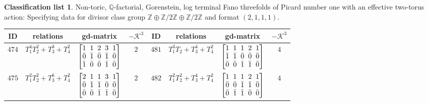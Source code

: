 \documentclass[10pt,a4paper]{amsart}
\theoremstyle{definition}
\newtheorem{class-list}[thm]{Classification list}
\def\ZZ{{\mathbb Z}}
\def\QQ{{\mathbb Q}}
\numberwithin{equation}{section}
\begin{document}
\begin{class-list}
Non-toric, $\QQ$-factorial, Gorenstein, log terminal Fano
threefolds of Picard number one with an effective two-torus action:
Specifying data for divisor class group
$\ZZ\oplus \ZZ/2\ZZ\oplus \ZZ/2\ZZ$ and format $(2,1,1,1)$.
\begin{table}[h!]\centering\setlength{\tabcolsep}{3.5pt}
\renewcommand{\arraystretch}{1.15}\small\tabulinesep=1mm
\begin{tabu}{c|c|c|c||c|c|c|c}
\hline
ID&relations&gd-matrix&$-\mathcal{K}^3$&ID&relations&gd-matrix&$-\mathcal{K}^3$
\\
\hline
${474}$&${T_{1}^{4}T_{2}^{2}+T_{3}^{3}+T_{4}^{2}}$
&$\arraycolsep=1mm\begin{bmatrix}{1} & {1} & {2} & {3} & {1} \\ {\bar{0}} & {\bar{1}} & {\bar{0}} & {\bar{1}} & {\bar{0}} \\ {\bar{1}} & {\bar{0}} & {\bar{0}} & {\bar{1}} & {\bar{0}}\end{bmatrix}$
&${2}$
&${481}$&${T_{1}^{3}T_{2}+T_{3}^{4}+T_{4}^{2}}$
&$\arraycolsep=1mm\begin{bmatrix}{1} & {1} & {1} & {2} & {1} \\ {\bar{1}} & {\bar{1}} & {\bar{0}} & {\bar{0}} & {\bar{0}} \\ {\bar{0}} & {\bar{0}} & {\bar{1}} & {\bar{1}} & {\bar{0}}\end{bmatrix}$
&${4}$
\\
\hline
${475}$&${T_{1}^{2}T_{2}^{2}+T_{3}^{6}+T_{4}^{2}}$
&$\arraycolsep=1mm\begin{bmatrix}{2} & {1} & {1} & {3} & {1} \\ {\bar{0}} & {\bar{1}} & {\bar{1}} & {\bar{0}} & {\bar{0}} \\ {\bar{0}} & {\bar{0}} & {\bar{1}} & {\bar{1}} & {\bar{0}}\end{bmatrix}$
&${2}$
&${482}$&${T_{1}^{2}T_{2}^{2}+T_{3}^{4}+T_{4}^{2}}$
&$\arraycolsep=1mm\begin{bmatrix}{1} & {1} & {1} & {2} & {1} \\ {\bar{0}} & {\bar{0}} & {\bar{1}} & {\bar{1}} & {\bar{0}} \\ {\bar{0}} & {\bar{1}} & {\bar{1}} & {\bar{0}} & {\bar{0}}\end{bmatrix}$
&${4}$
\\
\hline
\end{tabu}\vspace{2mm}
\end{table}


\end{class-list}
\end{document}
